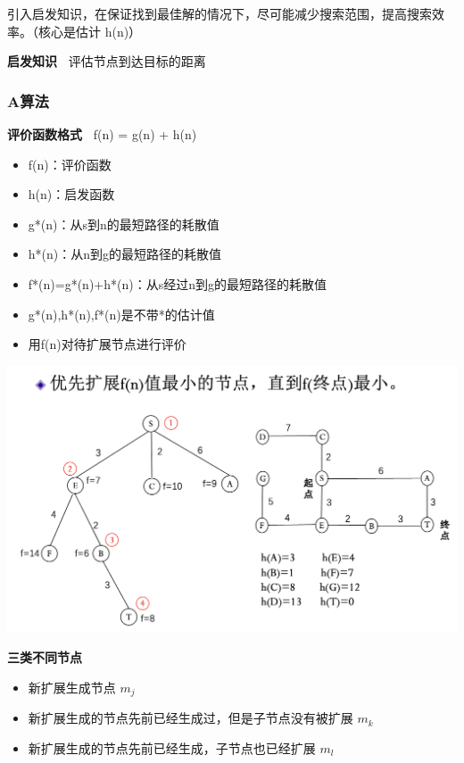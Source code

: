 \documentclass[b4paper, 10pt]{ctexart}
\makeatletter
\newenvironment{figurehere}
{\def\@captype{figure}}
{}
\makeatother
\begin{document}
\begin{multicols}{3}
引入启发知识，在保证找到最佳解的情况下，尽可能减少搜索范围，提高搜索效率。（核心是估计 h(n)）

\textbf{启发知识\ } 评估节点到达目标的距离

\subsubsection{A算法}

\textbf{评价函数格式\ } f(n) = g(n) + h(n)
\begin{itemize}
    \item f(n)：评价函数
    \item h(n)：启发函数
\end{itemize}

\begin{itemize}
    \item g*(n)：从s到n的最短路径的耗散值
    \item h*(n)：从n到g的最短路径的耗散值
    \item f*(n)=g*(n)+h*(n)：从s经过n到g的最短路径的耗散值
    \item g*(n),h*(n),f*(n)是不带*的估计值
    \item 用f(n)对待扩展节点进行评价
\end{itemize}


\begin{figurehere}
    \centering    \includegraphics[width=0.9\linewidth]{figs/A-algo.png}
    \label{fig:A-algo}
\end{figurehere}

\textbf{三类不同节点}
\begin{itemize}
    \item 新扩展生成节点 $m_j$
    \item 新扩展生成的节点先前已经生成过，但是子节点没有被扩展 $m_k$
    \item 新扩展生成的节点先前已经生成，子节点也已经扩展 $m_l$
\end{itemize}


\end{multicols}
\end{document}
